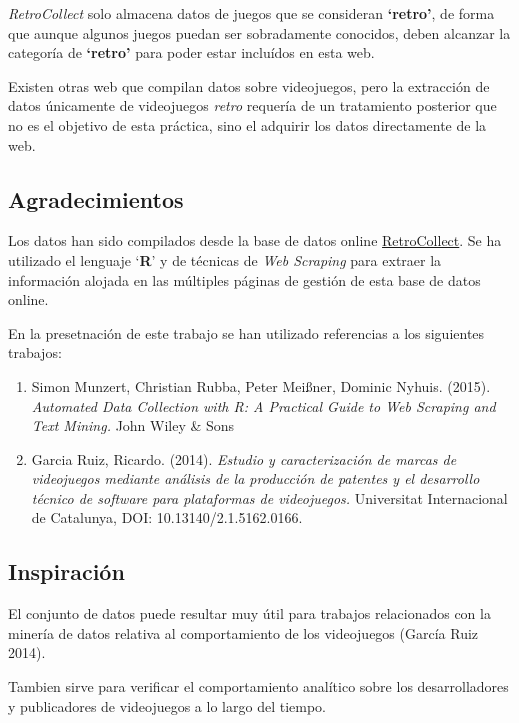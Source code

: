 \documentclass[]{article}
\providecommand{\tightlist}{%
  \setlength{\itemsep}{0pt}\setlength{\parskip}{0pt}}
\begin{document}
\emph{RetroCollect} solo almacena datos de juegos que se consideran
\textbf{`retro'}, de forma que aunque algunos juegos puedan ser
sobradamente conocidos, deben alcanzar la categoría de \textbf{`retro'}
para poder estar incluídos en esta web.

Existen otras web que compilan datos sobre videojuegos, pero la
extracción de datos únicamente de videojuegos \emph{retro} requería de
un tratamiento posterior que no es el objetivo de esta práctica, sino el
adquirir los datos directamente de la web.

\clearpage

\subsection{Agradecimientos}\label{agradecimientos}

Los datos han sido compilados desde la base de datos online
\href{http://www.retrocollect.com/}{RetroCollect}. Se ha utilizado el
lenguaje `\textbf{R}' y de técnicas de \emph{Web Scraping} para extraer
la información alojada en las múltiples páginas de gestión de esta base
de datos online.

En la presetnación de este trabajo se han utilizado referencias a los
siguientes trabajos:

\begin{enumerate}
\def\labelenumi{\arabic{enumi}.}
\tightlist
\item
  Simon Munzert, Christian Rubba, Peter Meißner, Dominic Nyhuis. (2015).
  \emph{Automated Data Collection with R: A Practical Guide to Web
  Scraping and Text Mining.} John Wiley \& Sons
\item
  Garcia Ruiz, Ricardo. (2014). \emph{Estudio y caracterización de
  marcas de videojuegos mediante análisis de la producción de patentes y
  el desarrollo técnico de software para plataformas de videojuegos.}
  Universitat Internacional de Catalunya, DOI: 10.13140/2.1.5162.0166.
\end{enumerate}

\subsection{Inspiración}\label{inspiracion}

El conjunto de datos puede resultar muy útil para trabajos relacionados
con la minería de datos relativa al comportamiento de los videojuegos
(García Ruiz 2014).

Tambien sirve para verificar el comportamiento analítico sobre los
desarrolladores y publicadores de videojuegos a lo largo del tiempo.
\end{document}
